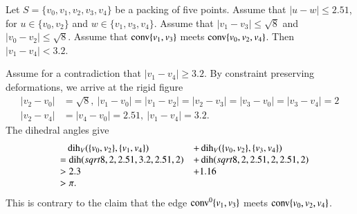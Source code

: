 \begin{tarskidata}
\begin{tarski}
\begin{lemma}
Let $S=\{v_0,v_1,v_2,v_3,v_4\}$ be a packing of five points.
Assume that $|u-w|\le 2.51$, for
$u\in\{v_0,v_2\}$ and $w\in\{v_1,v_3,v_4\}$.
Assume that $|v_1-v_3|\le \sqrt8$ and $|v_0-v_2|\le\sqrt8$.
Assume that ${\operatorname{conv}}\{v_1,v_3\}$ meets ${\operatorname{conv}}\{v_0,v_2,v_4\}$.
Then $|v_1-v_4|< 3.2$.
\end{lemma}

\begin{proved} Assume for a contradiction that $|v_1-v_4|\ge 3.2$.
By
constraint preserving deformations, we arrive at the rigid figure
    $$
    \begin{array}{lll}
    |v_2-v_0|&=\sqrt{8},\ |v_1-v_0|=|v_1-v_2|=|v_2-v_3|=|v_3-v_0|=|v_3-v_4|=2
    \\ |v_2-v_4|&=|v_4-v_0|=2.51,\ |v_1-v_4|=3.2.
    \end{array}
    $$
The dihedral angles give
    $$
    \begin{array}{rll}
    &\phantom{=}\operatorname{dih}_V(\{v_0,v_2\},\{v_1,v_4\}) &+ \operatorname{dih}_V(\{v_0,v_2\},\{v_3,v_4\})\\
    &= \operatorname{dih}(sqrt{8},2,2.51,3.2,2.51,2) &+
    \operatorname{dih}(sqrt{8},2,2.51,2,2.51,2)\\
    &> 2.3 &+ 1.16 \\
    &>\pi .
    \end{array}
    $$
This is contrary to the claim that the edge
${\operatorname{conv}}^0\{v_1,v_3\}$ meets ${\operatorname{conv}}\{v_0,v_2,v_4\}$.
\swallowed\end{proved}
\end{tarski}














\end{tarskidata}
